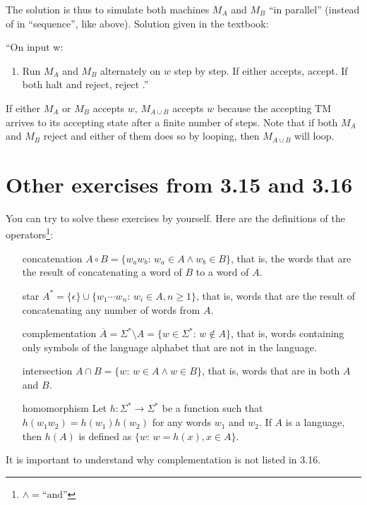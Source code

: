 \documentclass{article}
\newcommand{\0}{\texttt{\textvisiblespace}}
\newcommand{\°}{\obullet{\0}}
\newcommand{\st}{\colon\,}
\newcommand{\TM}{TM}
\begin{document}
The solution is thus to simulate both machines \(M_A\) and \(M_B\) ``in
parallel'' (instead of in ``sequence'', like above). Solution given in the textbook:

``On input w:
\begin{enumerate}
	\item Run \(M_A\) and \(M_B\) alternately on \(w\) step by step. If either accepts,
accept. If both halt and reject, reject .''
\end{enumerate}

If either \(M_A\) or \(M_B\) accepts \(w\), \(M_{A \cup B}\) accepts \(w\)
because the accepting \TM{} arrives to its
accepting state after a finite number of steps. Note that if both \(M_A\) and
\(M_B\) reject and either of them does so by looping, then \(M_{A \cup B}\)
will loop.

\section{Other exercises from 3.15 and 3.16}

You can try to solve these exercises by yourself. Here are the definitions of
the operators\footnote{\(\land = \text{``and''}\)}:
\begin{itemize}
\item[concatenation] \( A \circ B = \{ w_a w_b \st w_a \in A \land w_b \in
	B\}\), that is, the
	words that are the result of concatenating a word of \(B\) to a word of
	\(A\).
\item[star] \( A^* = \{ \epsilon \} \cup \{ w_1 \cdots w_n \st w_i \in A, n \ge
	1\}\), that is,
	words that are the result of concatenating any number of words from \(A\).
\item[complementation] \( \overline{A} = \Sigma^{*} \setminus A = \{ w \in \Sigma^{*} \st w \not \in A
	\}\), that is, words containing only symbols of the language alphabet that are not in the
	language.
\item[intersection] \( A \cap B = \{w \st w \in A \land w \in B\}\), that
	is, words that are in both \(A\) and \(B\).
\item[homomorphism] Let \(h \colon \Sigma^{*} \to \Sigma^{*}\)
	be a function such that \(h(w_1 w_2) = h(w_1) h(w_2)\) for any words
	\(w_1\) and \(w_2\). If \(A\) is
	a language, then \(h(A)\) is defined as \(\{ w \st w = h(x), x \in A\}\).
\end{itemize}

It is important to understand why complementation is not listed in 3.16.
\end{document}
